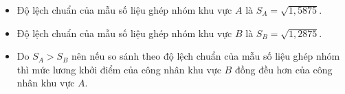 \begin{ex}
{\begin{itemchoice}
\begin{itemize}
		$$
		S_A^2=\dfrac{1}{20}\left(4\cdot 5{,}5^2+5\cdot 6{,}5^2+5\cdot 7{,}5^2+4\cdot 8{,}5^2+2\cdot 9{,}5^2\right)-(7{,}25)^2=1{,}5875.
		$$
		\item 	Độ lệch chuẩn của mẫu số liệu ghép nhóm khu vực $A$ là $S_A=\sqrt{1{,}5875}$.
		\item 	Độ lệch chuẩn của mẫu số liệu ghép nhóm khu vực $B$ là $S_B=\sqrt{1{,}2875}$.
		
	\item	Do $S_A > S_B$ nên nếu so sánh theo độ lệch chuẩn của mẫu số liệu ghép nhóm thì mức lương khởi điểm của công nhân khu vực $B$ đồng đều hơn của công nhân khu vực $A$.
	\end{itemize}	
	\end{itemchoice}
}
\end{ex}

